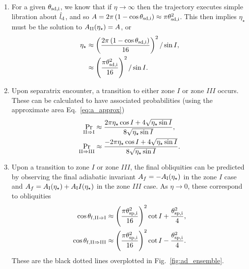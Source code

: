 \documentclass[
        fleqn,
        usenatbib,
        referee,
    ]{mnras}
\newcommand*{\p}[1]{\left(#1\right)}
\begin{document}
\begin{enumerate}
    \item For a given $\theta_{\rm sd, i}$, we know that if $\eta \to \infty$
        then the trajectory executes simple libration about $\hat{l}_{\rm d}$,
        and so $A = 2\pi\p{1 - \cos \theta_{\rm sd, i}} \approx \pi \theta_{\rm
        sd, i}^2$. This then implies $\eta_\star$ must be the solution to
        $A_{\rm II}(\eta_\star) = A$, or
        \begin{align}
            \eta_\star &\approx \p{\frac{2\pi\p{1 - \cos \theta_{\rm sd,i}}}{
                        16}}^2 / \sin I,\\
                    &\approx \p{\frac{\pi \theta_{\rm sd, i}^2}{16}}^2/\sin I.
        \end{align}

    \item Upon separatrix encounter, a transition to either zone $I$ or zone
        $III$ occurs. These can be calculated to have associated probabilities
        (using the approximate area Eq.~\eqref{eq:a_approx})
        \begin{subequations}
            \begin{align}
                \Pr_{\rm II \Rightarrow I} &\approx \frac{2\pi
                    \eta_{\star} \cos I + 4\sqrt{\eta_{\star}\sin
                    I}}{8\sqrt{\eta_{\star}\sin I}},\\
                \Pr_{\rm II \Rightarrow III} &\approx \frac{-2\pi
                    \eta_{\star} \cos I + 4\sqrt{\eta_{\star}\sin
                    I}}{8\sqrt{\eta_{\star}\sin I}}.
            \end{align}
        \end{subequations}

    \item Upon a transition to zone $I$ or zone $III$, the final obliquities can
        be predicted by observing the final adiabatic invariant $A_f = -A_{\rm
        I}(\eta_\star)$ in the zone $I$ case and $A_f = A_{\rm I}(\eta_\star) +
        A_{\rm I}I(\eta_\star)$ in the zone $III$ case. As $\eta \to 0$, these
        correspond to obliquities
        \begin{subequations}\label{se:q_f_approx}
            \begin{align}
                \cos \theta_{\rm f, II \Rightarrow I} &\approx
                    \p{\frac{\pi \theta_{\rm sp, i}^2}{16}}^2 \cot I
                        + \frac{\theta_{\rm sp, i}^2}{4},\\
                \cos \theta_{\rm f, II \Rightarrow III} &\approx
                    \p{\frac{\pi \theta_{\rm sp, i}^2}{16}}^2 \cot I
                        - \frac{\theta_{\rm sp, i}^2}{4}.
            \end{align}
        \end{subequations}
        These are the black dotted lines overplotted in
        Fig.~\ref{fig:ad_ensemble}.
\end{enumerate}
\end{document}
